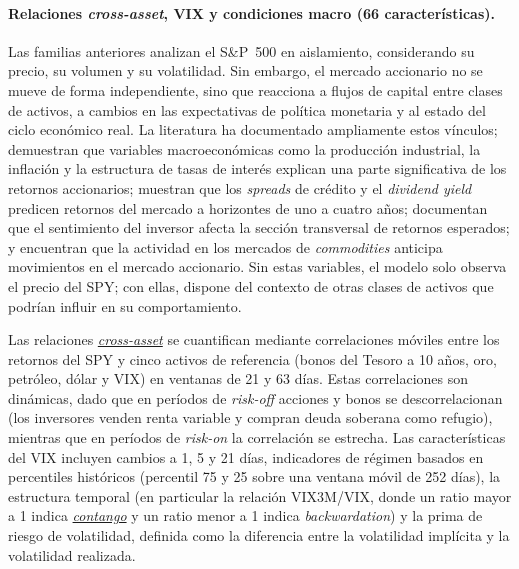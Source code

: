 \paragraph{Relaciones \textit{cross-asset}, VIX y condiciones macro (66 caracter\'isticas).}
Las familias anteriores analizan el S\&P~500 en aislamiento, considerando su precio, su volumen y su volatilidad. Sin embargo, el mercado accionario no se mueve de forma independiente, sino que reacciona a flujos de capital entre clases de activos, a cambios en las expectativas de pol\'itica monetaria y al estado del ciclo econ\'omico real. La literatura ha documentado ampliamente estos v\'inculos; \citet{chen1986} demuestran que variables macroecon\'omicas como la producci\'on industrial, la inflaci\'on y la estructura de tasas de inter\'es explican una parte significativa de los retornos accionarios; \citet{fama1989} muestran que los \textit{spreads} de cr\'edito y el \textit{dividend yield} predicen retornos del mercado a horizontes de uno a cuatro a\~nos; \citet{baker2006} documentan que el sentimiento del inversor afecta la secci\'on transversal de retornos esperados; y \citet{hong2012} encuentran que la actividad en los mercados de \textit{commodities} anticipa movimientos en el mercado accionario. Sin estas variables, el modelo solo observa el precio del SPY; con ellas, dispone del contexto de otras clases de activos que podr\'ian influir en su comportamiento.

Las relaciones \hyperlink{glos:cross_asset}{\textit{cross-asset}} se cuantifican mediante correlaciones m\'oviles entre los retornos del SPY y cinco activos de referencia (bonos del Tesoro a 10 a\~nos, oro, petr\'oleo, d\'olar y VIX) en ventanas de 21 y 63 d\'ias. Estas correlaciones son din\'amicas, dado que en per\'iodos de \textit{risk-off} acciones y bonos se descorrelacionan (los inversores venden renta variable y compran deuda soberana como refugio), mientras que en per\'iodos de \textit{risk-on} la correlaci\'on se estrecha. Las caracter\'isticas del VIX incluyen cambios a 1, 5 y 21 d\'ias, indicadores de r\'egimen basados en percentiles hist\'oricos (percentil 75 y 25 sobre una ventana m\'ovil de 252 d\'ias), la estructura temporal (en particular la relaci\'on VIX3M/VIX, donde un ratio mayor a 1 indica \hyperlink{glos:contango}{\textit{contango}} y un ratio menor a 1 indica \textit{backwardation}) y la prima de riesgo de volatilidad, definida como la diferencia entre la volatilidad impl\'icita y la volatilidad realizada.


